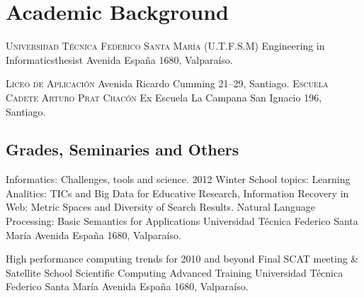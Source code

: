 \section{Academic Background}
	{\textsc{Universidad T\'ecnica Federico Santa Mar\'ia (U.T.F.S.M)}}
	{Engineering in Informatics}{thesist}
	{}
	{Avenida España 1680, Valparaíso.}
	

	{\textsc{Liceo de Aplicaci\'on}}
	{}
	{}
	{}
	{Avenida Ricardo Cumming 21--29, Santiago.}
	{\textsc{Escuela Cadete Arturo Prat Chac\'on}}
	{Ex Escuela La Campana}
	{}
	{}
	{San Ignacio 196, Santiago.}

\subsection{Grades, Seminaries and Others}

	{Informatics: Challenges, tools and science.}
	{2012 Winter School}
	{topics: Learning Analitics: TICs and Big Data for Educative Research, Information Recovery in Web: Metric Spaces and Diversity of Search Results. Natural Language Processing: Basic Semantics for Applications }
	{Universidad T\'ecnica Federico Santa Mar\'ia}
	{Avenida España 1680, Valpara\'iso.}
	
	
	{High performance computing trends for 2010 and beyond}
	{Final SCAT meeting \& Satellite School}
	{Scientific Computing Advanced Training}
	{Universidad T\'ecnica Federico Santa Mar\'ia}
	{Avenida España 1680, Valpara\'iso.}

%	
%	
%	
%
%	
